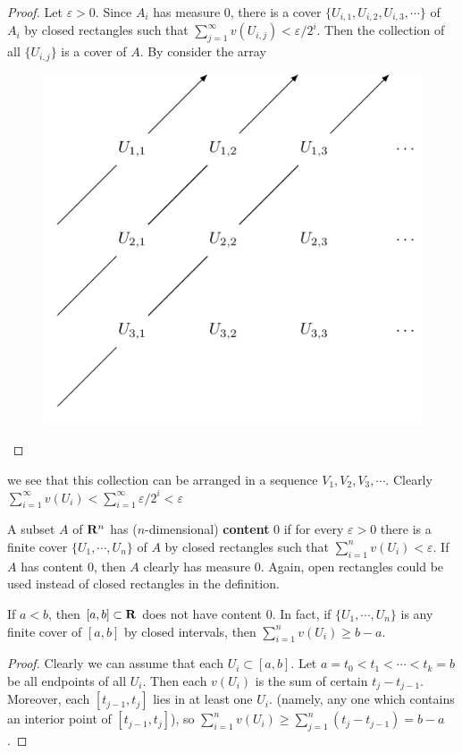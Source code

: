 \begin{proof}
    Let $\varepsilon>0$. Since $A_i$ has measure 0, there is a cover $\{U_{i,1}, U_{i,2}, U_{i,3}, \cdots \}$ 
    of $A_i$ by closed rectangles such that $\sum_{j=1}^{\infty}{v(U_{i,j})}< \varepsilon/2^i$. 
    Then the collection of all $\{U_{i,j}\}$ is a cover of $A$. By consider the array
    \begin{figure}[!htb]
        \centering
        \includegraphics[width=.6\linewidth]{./pics/Fig3-(2).pdf}
    \end{figure}
\end{proof}

we see that this collection can be arranged in a sequence  
$V_1, V_2, V_3,\cdots$. Clearly $\sum_{i=1}^{\infty}{v(U_i)}
<\sum_{i=1}^{\infty}{\varepsilon/2^i}<\varepsilon$

A subset $A$ of $\mathbf{R}^n$ has ($n$-dimensional) \textbf{content} 0 if for every 
$\varepsilon>0$ there is a finite cover $\{U_1, \cdots, U_n\}$ of $A$ by closed 
rectangles such that $\sum_{i=1}^{n}{v(U_i)}<\varepsilon$. If $A$ has content 0,
then $A$ clearly has measure 0. Again, open rectangles could be used instead of 
closed rectangles in the definition.

\begin{theorem}
    If $a<b$, then $[a, b]\subset \mathbf{R}$ does not have content 0.
    In fact, if $\{U_1, \cdots, U_n\}$ is any finite cover of $[a, b]$ by closed
    intervals, then $\sum_{i=1}^{n}{v(U_i)}\ge b-a$.  
\end{theorem}

\begin{proof}
    Clearly we can assume that each $U_i\subset [a, b]$. Let 
    $a=t_0<t_1<\cdots<t_k=b$ be all endpoints of all $U_i$.
    Then each $v(U_i)$ is the sum of certain $t_j-t_{j-1}$.
    Moreover, each $[t_{j-1}, t_j]$ lies in at least one $U_i$.
    (namely, any one which contains an  interior point of $[t_{j-1}, t_j]$),
    so $\sum_{i=1}^{n}{v(U_i)} \ge \sum_{j=1}^{n}{(t_j-t_{j-1})} = b-a$.
\end{proof}

